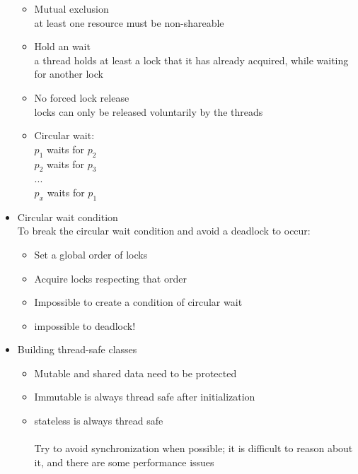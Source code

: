 \documentclass[a4paper]{article}
\begin{document}
\begin{itemize}
			\begin{itemize}
				\item Mutual exclusion \\at least one resource must be non-shareable
				\item Hold an wait \\a thread holds at least a lock that it has already acquired, while waiting for another lock
				\item No forced lock release \\ locks can only be released voluntarily by the threads
				\item Circular wait:
				\\$p_1$ waits for $p_2$
				\\$p_2$ waits for $p_3$
				\\...
				\\$p_x$ waits for $p_1$
			\end{itemize}
		\item Circular wait condition
		\\To break the circular wait condition and avoid a deadlock to occur:
			\begin{itemize}
				\item Set a global order of locks
				\item Acquire locks respecting that order
				\item Impossible to create a condition of circular wait
				\item impossible to deadlock!
			\end{itemize}
		\item Building thread-safe classes
			\begin{itemize}
				\item Mutable and shared data need to be protected
				\item Immutable is always thread safe after initialization
				\item stateless is always thread safe
				\\
				\\Try to avoid synchronization when possible; it is difficult to reason about it, and there are some performance issues


\end{itemize}
\end{itemize}
\end{document}
